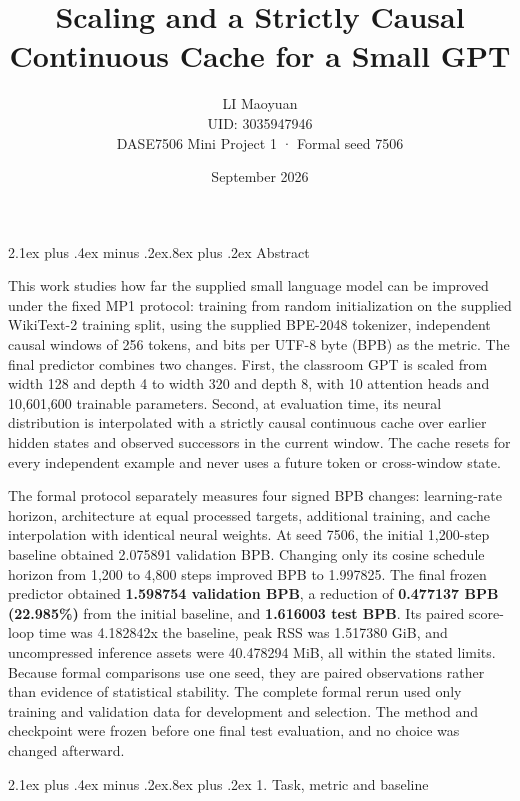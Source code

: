 \documentclass[11pt]{article}
\title{Scaling and a Strictly Causal Continuous Cache for a Small GPT}
\author{LI Maoyuan \\ UID: 3035947946 \\ \small DASE7506 Mini Project 1 · Formal seed 7506}
\date{September 2026}
\makeatletter
\renewcommand\section{\@startsection{section}{1}{0pt}%
  {2.1ex plus .4ex minus .2ex}{.8ex plus .2ex}%
  {\normalfont\large\bfseries}}
\makeatother
\begin{document}
\maketitle
\vspace{-0.4em}

\section{Abstract}\label{abstract}

This work studies how far the supplied small language model can be
improved under the fixed MP1 protocol: training from random
initialization on the supplied WikiText-2 training split, using the
supplied BPE-2048 tokenizer, independent causal windows of 256 tokens,
and bits per UTF-8 byte (BPB) as the metric. The final predictor
combines two changes. First, the classroom GPT is scaled from width 128
and depth 4 to width 320 and depth 8, with 10 attention heads and
10,601,600 trainable parameters. Second, at evaluation time, its neural
distribution is interpolated with a strictly causal continuous cache
over earlier hidden states and observed successors in the current
window. The cache resets for every independent example and never uses a
future token or cross-window state.

The formal protocol separately measures four signed BPB changes:
learning-rate horizon, architecture at equal processed targets,
additional training, and cache interpolation with identical neural
weights. At seed 7506, the initial 1,200-step baseline obtained 2.075891
validation BPB. Changing only its cosine schedule horizon from 1,200 to
4,800 steps improved BPB to 1.997825. The final frozen predictor
obtained \textbf{1.598754 validation BPB}, a reduction of
\textbf{0.477137 BPB (22.985\%)} from the initial baseline, and
\textbf{1.616003 test BPB}. Its paired score-loop time was 4.182842x the
baseline, peak RSS was 1.517380 GiB, and uncompressed inference assets
were 40.478294 MiB, all within the stated limits. Because formal
comparisons use one seed, they are paired observations rather than
evidence of statistical stability. The complete formal rerun used only
training and validation data for development and selection. The method
and checkpoint were frozen before one final test evaluation, and no
choice was changed afterward.

\section{1. Task, metric and baseline}\label{1-task-metric-and-baseline}
\end{document}
